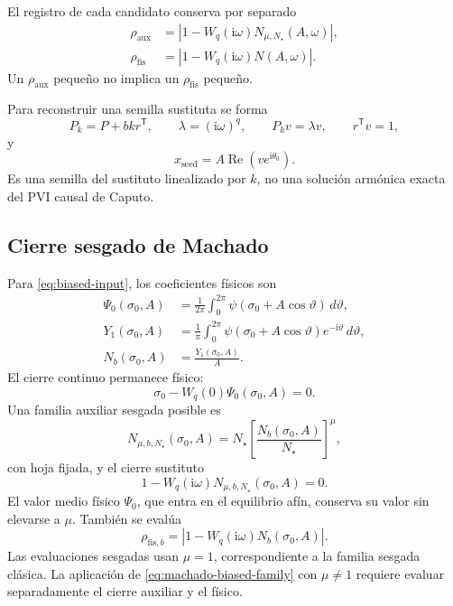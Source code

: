 El registro de cada candidato conserva por separado
\begin{align}
 \rho_{\mathrm{aux}}
 &=\left|1-W_q(\mathrm i\omega)N_{\mu,N_\star}(A,\omega)\right|,
 \label{eq:machado-rho-aux}\\
 \rho_{\mathrm{fis}}
 &=\left|1-W_q(\mathrm i\omega)N(A,\omega)\right|.
 \label{eq:machado-rho-phys}
\end{align}
Un \(\rho_{\mathrm{aux}}\) pequeño no implica un \(\rho_{\mathrm{fis}}\)
pequeño.

Para reconstruir una semilla sustituta se forma
\begin{equation}
 P_k=P+bkr^{\mathsf T},\qquad
 \lambda=(\mathrm i\omega)^q,\qquad
 P_kv=\lambda v,\qquad r^{\mathsf T}v=1,
 \label{eq:machado-modal}
\end{equation}
y
\begin{equation}
 x_{\mathrm{seed}}=A\operatorname{Re}(ve^{\mathrm i\theta_0}).
 \label{eq:machado-seed}
\end{equation}
Es una semilla del sustituto linealizado por \(k\), no una solución armónica
exacta del PVI causal de Caputo.

\subsection{Cierre sesgado de Machado}

Para \cref{eq:biased-input}, los coeficientes físicos son
\begin{align}
 \Psi_0(\sigma_0,A)
 &=\frac{1}{2\pi}\int_0^{2\pi}
 \psi(\sigma_0+A\cos\vartheta)\,d\vartheta,
 \label{eq:machado-biased-dc}\\
 Y_1(\sigma_0,A)
 &=\frac{1}{\pi}\int_0^{2\pi}
 \psi(\sigma_0+A\cos\vartheta)e^{-\mathrm i\vartheta}\,d\vartheta,
 \label{eq:machado-biased-y1}\\
 N_b(\sigma_0,A)&=\frac{Y_1(\sigma_0,A)}{A}.
 \label{eq:machado-biased-df}
\end{align}
El cierre continuo permanece físico:
\begin{equation}
 \sigma_0-W_q(0)\Psi_0(\sigma_0,A)=0.
 \label{eq:machado-biased-dc-closure}
\end{equation}
Una familia auxiliar sesgada posible es
\begin{equation}
 N_{\mu,b,N_\star}(\sigma_0,A)
 =N_\star\left[\frac{N_b(\sigma_0,A)}{N_\star}\right]^\mu,
 \label{eq:machado-biased-family}
\end{equation}
con hoja fijada, y el cierre sustituto
\begin{equation}
 1-W_q(\mathrm i\omega)N_{\mu,b,N_\star}(\sigma_0,A)=0.
 \label{eq:machado-biased-closure}
\end{equation}
El valor medio físico \(\Psi_0\), que entra en el equilibrio afín, conserva su
valor sin elevarse a \(\mu\). También se evalúa
\begin{equation}
 \rho_{\mathrm{fis},b}
 =\left|1-W_q(\mathrm i\omega)N_b(\sigma_0,A)\right|.
 \label{eq:machado-biased-physical-residual}
\end{equation}
Las evaluaciones sesgadas usan \(\mu=1\), correspondiente a la familia
sesgada clásica. La aplicación de \cref{eq:machado-biased-family} con
\(\mu\neq1\) requiere evaluar separadamente el cierre auxiliar y el físico.

